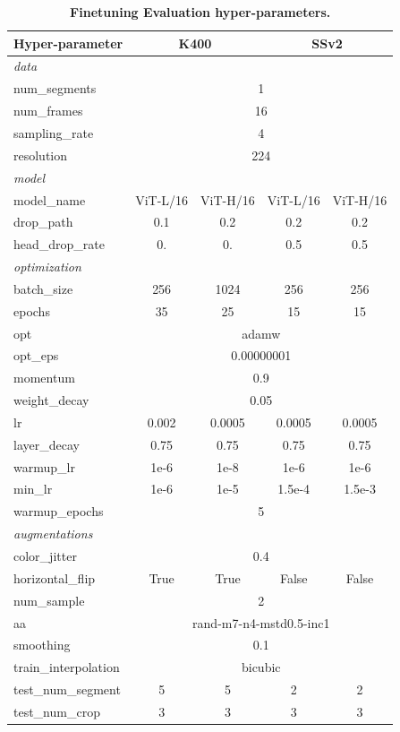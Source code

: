 \documentclass[twocolumn]{fairmeta}
\theoremstyle{plain}
\theoremstyle{definition}
\theoremstyle{remark}
\begin{document}
\begin{table}
    \centering
    \caption{\bf\small Finetuning Evaluation hyper-parameters.}
    \label{tab:fine_tuning_hp}
    {\fontsize{10pt}{10pt}\selectfont
    \setlength{\tabcolsep}{2pt}
    \begin{tabular}{ l cc @{\hspace{1cm}} cc}
        \toprule
        Hyper-parameter & \multicolumn{2}{c}{K400} & \multicolumn{2}{c}{SSv2} \\
        \midrule \textit{data} \\
        num\_segments & \multicolumn{4}{c}{1}\\
        num\_frames & \multicolumn{4}{c}{16}  \\
        sampling\_rate & \multicolumn{4}{c}{4} \\
        resolution & \multicolumn{4}{c}{224}  \\
        
        \midrule \textit{model} \\
        model\_name & ViT-L/16 & ViT-H/16 & ViT-L/16 & ViT-H/16 \\
        drop\_path & 0.1 & 0.2 & 0.2 & 0.2 \\
        head\_drop\_rate & 0. & 0. & 0.5 & 0.5 \\
        
        \midrule \textit{optimization} \\
        batch\_size & 256& 1024 & 256 & 256 \\
        epochs & 35 & 25 & 15 & 15 \\
        opt & \multicolumn{4}{c}{adamw} \\
        opt\_eps & \multicolumn{4}{c}{0.00000001}\\
        momentum & \multicolumn{4}{c}{0.9} \\
        weight\_decay & \multicolumn{4}{c}{0.05}\\
        lr & 0.002 & 0.0005 & 0.0005 & 0.0005 \\
        layer\_decay & 0.75 & 0.75 & 0.75 & 0.75  \\
        warmup\_lr & 1e-6 & 1e-8 & 1e-6 & 1e-6  \\
        min\_lr & 1e-6 & 1e-5  & 1.5e-4 & 1.5e-3 \\
        warmup\_epochs & \multicolumn{4}{c}{5}\\
        
        \midrule \textit{augmentations} \\
        color\_jitter & \multicolumn{4}{c}{0.4} \\ 
        horizontal\_flip & True & True & False & False\\
        num\_sample & \multicolumn{4}{c}{2} \\
        aa & \multicolumn{4}{c}{rand-m7-n4-mstd0.5-inc1} \\
        smoothing & \multicolumn{4}{c}{0.1} \\
        train\_interpolation & \multicolumn{4}{c}{bicubic} \\
        test\_num\_segment & 5 & 5 & 2 & 2 \\
        test\_num\_crop & 3 & 3 & 3 & 3 \\
        

\end{tabular}}
\end{table}
\end{document}
